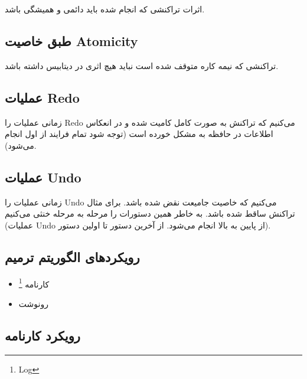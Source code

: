 \documentclass[a4paper]{article}
\begin{document}
اثرات تراکنشی که انجام شده باید دائمی و همیشگی باشد.


\subsection*{طبق خاصیت Atomicity}

تراکنشی که نیمه کاره متوقف شده است نباید هیچ اثری در دیتابیس داشته باشد.

\subsection{عملیات Redo}

زمانی عملیات را Redo می‌کنیم که تراکنش به صورت کامل کامیت شده و در انعکاس
اطلاعات در حافظه به مشکل خورده است (توجه شود تمام فرایند از اول انجام می‌شود).

\subsection{عملیات Undo}

زمانی عملیات را Undo می‌کنیم که خاصیت جامیعت نقض شده باشد. برای مثال تراکنش ساقط
شده باشد. به خاطر همین دستورات را مرحله به مرحله خنثی می‌کنیم (عملیات Undo از
پایین به بالا انجام می‌شود. از آخرین دستور تا اولین دستور).

\subsection{رویکرد‌های الگوریتم ترمیم}

\begin{itemize}
    \item کارنامه \footnote{Log}
    \item رونوشت
\end{itemize}

\subsection{رویکرد کارنامه}
\end{document}

